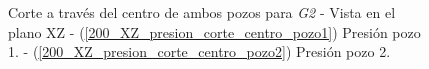 \documentclass[10pt,a4paper,final]{article}
\begin{document}
\begin{figure}[H]
   \centering
   \hspace{0.1\linewidth}
    \caption{Corte a través del centro de ambos pozos para \emph{G2} - Vista en el plano XZ - (\ref{200_XZ_presion_corte_centro_pozo1}) Presión pozo 1. - (\ref{200_XZ_presion_corte_centro_pozo2})  Presión pozo 2.}
   \label{200_XZ_presion_corte_centro}                %
\end{figure}
\end{document}
